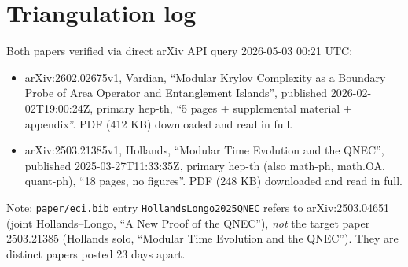 \documentclass[11pt]{article}
\theoremstyle{remark}
\begin{document}
\section{Triangulation log}

Both papers verified via direct arXiv API query 2026-05-03 00:21 UTC:
\begin{itemize}
\item arXiv:2602.02675v1, Vardian, ``Modular Krylov Complexity as a Boundary
Probe of Area Operator and Entanglement Islands'', published
2026-02-02T19:00:24Z, primary hep-th, ``5 pages + supplemental material
+ appendix''. PDF (412 KB) downloaded and read in full.
\item arXiv:2503.21385v1, Hollands, ``Modular Time Evolution and the QNEC'',
published 2025-03-27T11:33:35Z, primary hep-th (also math-ph, math.OA,
quant-ph), ``18 pages, no figures''. PDF (248 KB) downloaded and read in
full.
\end{itemize}
Note: \texttt{paper/eci.bib} entry \texttt{HollandsLongo2025QNEC} refers to
arXiv:2503.04651 (joint Hollands--Longo, ``A New Proof of the QNEC''),
\emph{not} the target paper 2503.21385 (Hollands solo, ``Modular Time
Evolution and the QNEC''). They are distinct papers posted 23 days apart.
\end{document}
